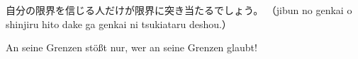 {\raggedleft
\begin{minipage}[b]{\widthof{{\smaller\textcolor{black!60}{（jibun no genkai o shinjiru hito dake ga genkai ni tsukiataru deshou.）}}}}
自分の限界を信じる人だけが限界に突き当たるでしょう。\nl%
{\smaller\textcolor{black!60}{（jibun no genkai o shinjiru hito dake ga genkai ni tsukiataru deshou.）}}%
\end{minipage}\hspace*{4em}\nl%
An seine Grenzen stößt nur, wer an seine Grenzen glaubt!\\
}